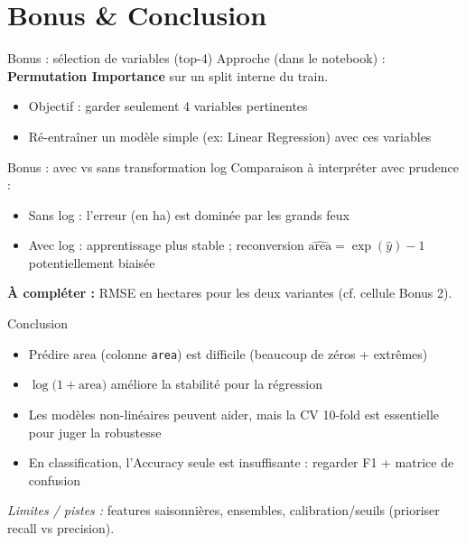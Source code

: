 \documentclass[aspectratio=169,11pt]{beamer}
\newcommand{\Area}{\ensuremath{\mathrm{area}}}
\newcommand{\AreaCol}{\texttt{area}}
\newcommand{\LogArea}{\ensuremath{\log\!\bigl(1+\Area\bigr)}}
\begin{document}
\section{Bonus \& Conclusion}

\begin{frame}{Bonus : s\'election de variables (top-4)}
  Approche (dans le notebook) : \textbf{Permutation Importance} sur un split interne du train.
  \begin{itemize}
    \item Objectif : garder seulement 4 variables pertinentes
    \item R\'e-entra\^iner un mod\`ele simple (ex: Linear Regression) avec ces variables
  \end{itemize}

  \vspace{0.4em}
\end{frame}

\begin{frame}{Bonus : avec vs sans transformation log}
  Comparaison \`a interpr\'eter avec prudence :
  \begin{itemize}
    \item Sans log : l'erreur (en ha) est domin\'ee par les grands feux
    \item Avec log : apprentissage plus stable ; reconversion \(\widehat{\Area}=\exp(\hat{y})-1\) potentiellement biais\'ee
  \end{itemize}

  \vspace{0.4em}
  \textbf{\`A compl\'eter :} RMSE en hectares pour les deux variantes (cf. cellule Bonus 2).
\end{frame}

\begin{frame}{Conclusion}
  \begin{itemize}
    \item Pr\'edire $\Area$ (colonne \AreaCol) est difficile (beaucoup de z\'eros + extr\^emes)
    \item \(\LogArea\) am\'eliore la stabilit\'e pour la r\'egression
    \item Les mod\`eles non-lin\'eaires peuvent aider, mais la CV 10-fold est essentielle pour juger la robustesse
    \item En classification, l'Accuracy seule est insuffisante : regarder F1 + matrice de confusion
  \end{itemize}

  \vspace{0.6em}
  \textit{Limites / pistes :} features saisonni\`eres, ensembles, calibration/seuils (prioriser recall vs precision).
\end{frame}
\end{document}
